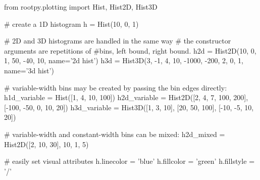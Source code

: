 \begin{footnotesize}
\begin{pyglist}[language=python,texcl=true,style=vs,bgcolor=Moccasin]
from rootpy.plotting import Hist, Hist2D, Hist3D

# create a 1D histogram
h = Hist(10, 0, 1)

# 2D and 3D histograms are handled in the same way
# the constructor arguments are repetitions of #bins, left bound, right bound.
h2d = Hist2D(10, 0, 1, 50, -40, 10, name='2d hist')
h3d = Hist3D(3, -1, 4, 10, -1000, -200, 2, 0, 1, name='3d hist')

# variable-width bins may be created by passing the bin edges directly:
h1d_variable = Hist([1, 4, 10, 100])
h2d_variable = Hist2D([2, 4, 7, 100, 200], [-100, -50, 0, 10, 20])
h3d_variable = Hist3D([1, 3, 10], [20, 50, 100], [-10, -5, 10, 20])

# variable-width and constant-width bins can be mixed:
h2d_mixed = Hist2D([2, 10, 30], 10, 1, 5)

# easily set visual attributes
h.linecolor = 'blue'
h.fillcolor = 'green'
h.fillstyle = '/'
\end{pyglist}
\end{footnotesize}
